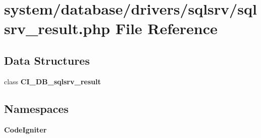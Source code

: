 \section{system/database/drivers/sqlsrv/sqlsrv\-\_\-result.php File Reference}
\label{sqlsrv__result_8php}
\subsection*{Data Structures}
\begin{DoxyCompactItemize}
\item 
class {\bf C\-I\-\_\-\-D\-B\-\_\-sqlsrv\-\_\-result}
\end{DoxyCompactItemize}
\subsection*{Namespaces}
\begin{DoxyCompactItemize}
\item 
{\bf Code\-Igniter}
\end{DoxyCompactItemize}
